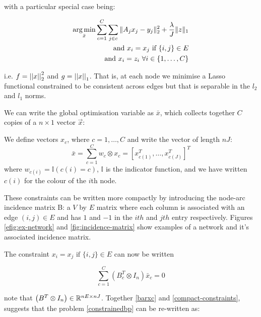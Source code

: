 with a particular special case being:

\begin{align}
\operatorname*{arg\,min}_{\bar{x}} \sum_{c=1}^C \sum_{j \in c} \|A_jx_j - y_j\|_2^2 + \frac{\lambda}{J}\|z\|_1 \nonumber \\ 
\text{ and } x_i = x_j \text{ if } \{i,j\} \in E \nonumber \\
\text{ and } x_i = z_i \text{ } \forall i \in \{1, \ldots, C\}
\label{constrainedbp}
\end{align}

i.e. \(f = \left|\left|x\right|\right|_2^2\) and \(g = \left|\left|x\right|\right|_1\). That is, at each node we minimise a Lasso functional constrained to be consistent across edges but that is separable in the \(l_2\) and \(l_1\) norms.

We can write the global optimisation variable as \(\bar{x}\), which collects together \(C\) copies of a \(n\times 1\) vector \(\vec{x}\):

\begin{defn}
We define vectors \(x_c\), where \(c = 1,\ldots , C\) and write the vector of length \(nJ\):
\begin{equation}
\bar{x} = \sum_{c=1}^C w_c \otimes x_c = \left[x_{c(1)}^T, \ldots	, x_{c(J)}^T\right]^T
\label{barxc}
\end{equation}
where \(w_{c(i)} = \mathbb{I}(c(i) = c)\), \(\mathbb{I}\) is the indicator function, and we have written \(c(i)\) for the colour of the \(i\)th node.
\end{defn}

These constraints can be written more compactly by introducing the node-arc incidence matrix B: a \(V\) by \(E\) matrix where each column is associated with an edge \(\left(i,j\right) \in E\) and has \(1\) and \(-1\) in the \(ith\) and \(jth\) entry respectively. Figures \eqref{efig:ex-network} and \eqref{fig:incidence-matrix} show examples of a network and it's associated incidence matrix.

The constraint \(x_i = x_j \text{ if } \{i,j\} \in E \) can now be written 

\begin{equation}
\sum_{c=1}^C\left(B_c^T \otimes I_n\right)\bar{x}_c = 0
\label{compact-constraints}
\end{equation}

note that \(\left(B^T\otimes I_n \right) \in {\mathbb{R}}^{nE \times nJ}\). Together \eqref{barxc} and \eqref{compact-constraints}, suggests that the problem \eqref{constrainedbp} can be re-written as:

